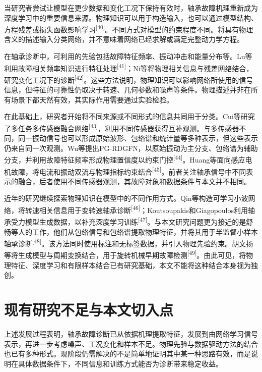 \documentclass[UTF8,12pt,openany,twoside]{ctexbook}
\numberwithin{equation}{chapter}
\begin{document}
当研究者尝试让模型在更少数据和变化工况下保持有效时，轴承故障机理重新成为深度学习中的重要信息来源。物理知识可以用于构造输入，也可以通过模型结构、方程残差或损失函数影响学习\textsuperscript{[40]}。不同方式对模型的约束程度不同。将具有物理含义的描述输入分类网络，并不意味着网络已经求解或满足完整动力学方程。

在轴承诊断中，可利用的先验包括故障特征频率、振动冲击和能量分布等。Lu等利用故障相关频率知识进行特征处理\textsuperscript{[41]}；Ni等将物理相关信息与残差网络结合，研究变化工况下的诊断\textsuperscript{[42]}。这些方法说明，物理知识可以影响网络所使用的信号信息，但特征的可靠性仍取决于转速、几何参数和噪声等条件。物理描述并非在所有场景下都天然有效，其实际作用需要通过实验检验。

在此基础上，研究者开始将不同来源或不同形式的信息共同用于分类。Cui等研究了多任务多传感器融合网络\textsuperscript{[43]}，利用不同传感器获得互补观测。与多传感器不同，同一振动信号也可以形成原始波形、包络谱和统计量等多种表示，但这些表示仍来自同一次观测。Wu等提出PG-RDGFN，以原始振动为主分支、包络谱为辅助分支，并利用故障特征频率形成物理置信度以约束门控\textsuperscript{[44]}。Huang等面向感应电机故障，将电流和振动双流与物理指标约束结合\textsuperscript{[45]}。前者关注轴承信号中不同表示的融合，后者使用不同传感器观测，其故障对象和数据条件与本文并不相同。

近年的研究继续探索物理知识在模型中的不同作用方式。Qin等构造可学习小波网络，将转速相关信息用于变转速轴承诊断\textsuperscript{[46]}；Koutsoupakis和Giagopoulos利用轴承受力模型生成数据，以补充深度学习训练\textsuperscript{[47]}。与本文研究问题更为接近的是舒畅等人的工作，他们从包络信号和包络谱提取物理特征，并将其用于半监督小样本轴承诊断\textsuperscript{[48]}。该方法同时使用标注和无标签数据，并引入物理先验约束。胡文扬等将生成模型与周期变换结合，用于旋转机械早期故障检测\textsuperscript{[49]}。由此可见，将物理特征、深度学习和有限样本结合已有研究基础，本文不能将这种结合本身视为独创。

\section{现有研究不足与本文切入点}\label{ux73b0ux6709ux7814ux7a76ux4e0dux8db3ux4e0eux672cux6587ux5207ux5165ux70b9}

上述发展过程表明，轴承故障诊断已从依据机理提取特征，发展到由网络学习信号表示，再进一步考虑噪声、工况变化和样本不足。物理先验与数据驱动方法的结合也已有多种形式。现阶段仍需解决的不是简单地证明其中某一种思路有效，而是说明在具体数据条件下，不同信息和训练方式能否为诊断带来稳定收益。
\end{document}
